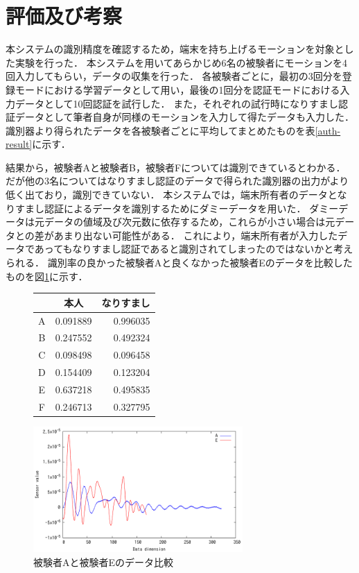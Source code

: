 \section{評価及び考察}
本システムの識別精度を確認するため，端末を持ち上げるモーションを対象とした実験を行った．
本システムを用いてあらかじめ6名の被験者にモーションを4回入力してもらい，データの収集を行った．
各被験者ごとに，最初の3回分を登録モードにおける学習データとして用い，最後の1回分を認証モードにおける入力データとして10回認証を試行した．
また，それぞれの試行時になりすまし認証データとして筆者自身が同様のモーションを入力して得たデータも入力した．
識別器より得られたデータを各被験者ごとに平均してまとめたものを表\ref{auth-result}に示す．

結果から，被験者Aと被験者B，被験者Fについては識別できているとわかる．
だが他の3名についてはなりすまし認証のデータで得られた識別器の出力がより低く出ており，識別できていない．
本システムでは，端末所有者のデータとなりすまし認証によるデータを識別するためにダミーデータを用いた．
ダミーデータは元データの値域及び次元数に依存するため，これらが小さい場合は元データとの差があまり出ない可能性がある．
これにより，端末所有者が入力したデータであってもなりすまし認証であると識別されてしまったのではないかと考えられる．
識別率の良かった被験者Aと良くなかった被験者Eのデータを比較したものを図\ref{compare}に示す．

\begin{figure}[!tb]
  \def\@captype{table}
  \begin{minipage}{.48\textwidth}
    \centering
    \label{auth-result}
    \begin{tabular}{|c|r|r|} \hline
      \multicolumn{1}{|c|}{}  & \multicolumn{1}{c|}{本人} & \multicolumn{1}{c|}{なりすまし} \\ \hline \hline
      A & 0.091889 & 0.996035 \\ \hline
      B & 0.247552 & 0.492324 \\ \hline
      C & 0.098498 & 0.096458 \\ \hline
      D & 0.154409 & 0.123204 \\ \hline
      E & 0.637218 & 0.495835 \\ \hline
      F & 0.246713 & 0.327795 \\ \hline
    \end{tabular}
  \end{minipage}
  \hfill
  \begin{minipage}{.48\textwidth}
    \centering
    \includegraphics[bb=0 0 360 216, width=8cm]{Graphs/comp.pdf}
    \caption{被験者Aと被験者Eのデータ比較}
    \label{compare}
  \end{minipage}
\end{figure}
